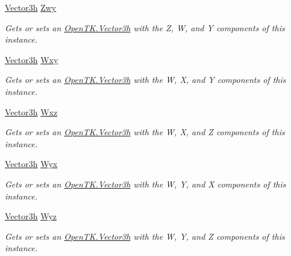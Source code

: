 \begin{DoxyCompactItemize}
\hyperlink{struct_open_t_k_1_1_vector3h}{Vector3h} \hyperlink{struct_open_t_k_1_1_vector4h_a4c6963a1a4c2a981ffe0d19e4ff6258c}{Zwy}
\begin{DoxyCompactList}\small\item\em Gets or sets an \hyperlink{struct_open_t_k_1_1_vector3h}{Open\-T\-K.\-Vector3h} with the Z, W, and Y components of this instance. \end{DoxyCompactList}\item 
\hyperlink{struct_open_t_k_1_1_vector3h}{Vector3h} \hyperlink{struct_open_t_k_1_1_vector4h_a9df517991a150c7fa71ff65e35687609}{Wxy}
\begin{DoxyCompactList}\small\item\em Gets or sets an \hyperlink{struct_open_t_k_1_1_vector3h}{Open\-T\-K.\-Vector3h} with the W, X, and Y components of this instance. \end{DoxyCompactList}\item 
\hyperlink{struct_open_t_k_1_1_vector3h}{Vector3h} \hyperlink{struct_open_t_k_1_1_vector4h_a91334e78007962c42553336c28c26815}{Wxz}
\begin{DoxyCompactList}\small\item\em Gets or sets an \hyperlink{struct_open_t_k_1_1_vector3h}{Open\-T\-K.\-Vector3h} with the W, X, and Z components of this instance. \end{DoxyCompactList}\item 
\hyperlink{struct_open_t_k_1_1_vector3h}{Vector3h} \hyperlink{struct_open_t_k_1_1_vector4h_a7ea82f9d012ff182ce3f009263304d2c}{Wyx}
\begin{DoxyCompactList}\small\item\em Gets or sets an \hyperlink{struct_open_t_k_1_1_vector3h}{Open\-T\-K.\-Vector3h} with the W, Y, and X components of this instance. \end{DoxyCompactList}\item 
\hyperlink{struct_open_t_k_1_1_vector3h}{Vector3h} \hyperlink{struct_open_t_k_1_1_vector4h_a600016f1379837bbd42a3caa69eebe8e}{Wyz}
\begin{DoxyCompactList}\small\item\em Gets or sets an \hyperlink{struct_open_t_k_1_1_vector3h}{Open\-T\-K.\-Vector3h} with the W, Y, and Z components of this instance. \end{DoxyCompactList}\item 

\end{DoxyCompactItemize}
